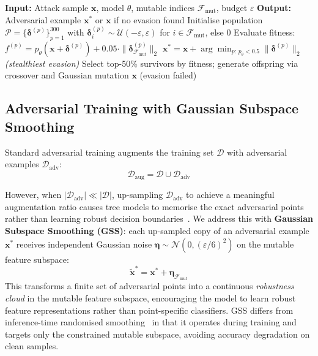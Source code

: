 \documentclass[review,12pt]{elsarticle}
\begin{document}
\begin{algorithm}[htbp]
\caption{Multi-Objective Feature-Constrained GA}
\label{alg:ga}
\begin{algorithmic}[1]
\State \textbf{Input:} Attack sample $\mathbf{x}$, model $\theta$, mutable indices $\mathcal{F}_\text{mut}$, budget $\varepsilon$
\State \textbf{Output:} Adversarial example $\mathbf{x}^*$ or $\mathbf{x}$ if no evasion found
\State Initialise population $\mathcal{P} = \{\boldsymbol{\delta}^{(p)}\}_{p=1}^{300}$ with $\boldsymbol{\delta}^{(p)}_i \sim \mathcal{U}(-\varepsilon, \varepsilon)$ for $i \in \mathcal{F}_\text{mut}$, else $0$
    \State Evaluate fitness: $f^{(p)} = p_\theta(\mathbf{x} + \boldsymbol{\delta}^{(p)}) + 0.05 \cdot \|\boldsymbol{\delta}^{(p)}_{\mathcal{F}_\text{mut}}\|_2$
        \State \Return $\mathbf{x}^* = \mathbf{x} + \arg\min_{p:\, p_\theta < 0.5} \|\boldsymbol{\delta}^{(p)}\|_2$ \quad \textit{(stealthiest evasion)}
    \EndIf
    \State Select top-50\% survivors by fitness; generate offspring via crossover and Gaussian mutation
\EndFor
\State \Return $\mathbf{x}$ \quad (evasion failed)
\end{algorithmic}
\end{algorithm}

\subsection{Adversarial Training with Gaussian Subspace Smoothing}

Standard adversarial training augments the training set $\mathcal{D}$ with adversarial examples $\mathcal{D}_\text{adv}$:
\[
\mathcal{D}_\text{aug} = \mathcal{D} \cup \mathcal{D}_\text{adv}
\]

However, when $|\mathcal{D}_\text{adv}| \ll |\mathcal{D}|$, up-sampling $\mathcal{D}_\text{adv}$ to achieve a meaningful augmentation ratio causes tree models to memorise the exact adversarial points rather than learning robust decision boundaries~\cite{madry2018towards}. We address this with \textbf{Gaussian Subspace Smoothing (GSS)}: each up-sampled copy of an adversarial example $\mathbf{x}^*$ receives independent Gaussian noise $\boldsymbol{\eta} \sim \mathcal{N}(0, (\varepsilon/6)^2)$ on the mutable feature subspace:
\[
\tilde{\mathbf{x}}^* = \mathbf{x}^* + \boldsymbol{\eta}_{\mathcal{F}_\text{mut}}
\]
This transforms a finite set of adversarial points into a continuous \emph{robustness cloud} in the mutable feature subspace, encouraging the model to learn robust feature representations rather than point-specific classifiers. GSS differs from inference-time randomised smoothing~\cite{cohen2019certified} in that it operates during training and targets only the constrained mutable subspace, avoiding accuracy degradation on clean samples.
\end{document}
